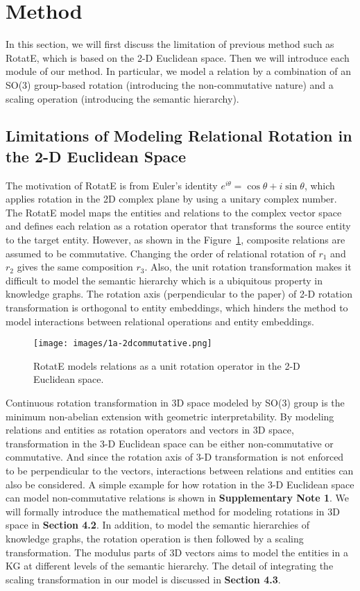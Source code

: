 \documentclass[11pt]{article}
\begin{document}
\section{Method}


In this section, we will first discuss the limitation of previous method such as RotatE, which is based on the 2-D Euclidean space. Then we will introduce each module of our method. In particular, we model a relation by a combination of an SO(3) group-based rotation (introducing the non-commutative nature) and a scaling operation (introducing the semantic hierarchy).

\subsection{Limitations of Modeling Relational Rotation in the 2-D Euclidean Space}

The motivation of RotatE is from Euler’s identity \(e^{i\theta} = \cos{\theta} + i\sin{\theta}\), which applies rotation in the 2D complex plane by using a unitary complex number. The RotatE model maps the entities and relations to the complex vector space and defines each relation as a rotation operator that transforms the source entity to the target entity. However, as shown in the Figure~\ref{rotation_in_2D}, composite relations are assumed to be commutative. Changing the order of relational rotation of \(r_1\) and \(r_2\) gives the same composition \(r_3\). Also, the unit rotation transformation makes it difficult to model the semantic hierarchy which is a ubiquitous property in knowledge graphs. The rotation axis (perpendicular to the paper) of 2-D rotation transformation is orthogonal to entity embeddings, which hinders the method to model interactions between relational operations and entity embeddings. 

\begin{figure}[!ht]
\centering     \centering
\texttt{[image: images/1a-2dcommutative.png]}
\caption{RotatE models relations as a unit rotation operator in the 2-D Euclidean space.}
\label{rotation_in_2D}
\end{figure}

Continuous rotation transformation in 3D space modeled by SO(3) group is the minimum non-abelian extension with geometric interpretability. By modeling relations and entities as rotation operators and vectors in 3D space, transformation in the 3-D Euclidean space can be either non-commutative or commutative. And since the rotation axis of 3-D transformation is not enforced to be perpendicular to the vectors, interactions between relations and entities can also be considered. A simple example for how rotation in the 3-D Euclidean space can model non-commutative relations is shown in \textbf{Supplementary Note 1}. We will formally introduce the mathematical method for modeling rotations in 3D space in \textbf{Section 4.2}. In addition, to model the semantic hierarchies of knowledge graphs, the rotation operation is then followed by a scaling transformation. The modulus parts of 3D vectors aims to model the entities in a KG at different levels of the semantic hierarchy. The detail of integrating the scaling transformation in our model is discussed in \textbf{Section 4.3}.
\end{document}
